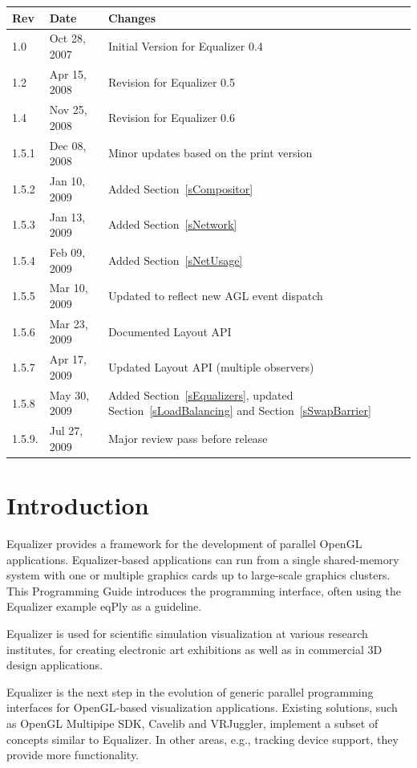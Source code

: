 \documentclass[10pt,a4]{scrartcl}
\newcommand{\sref}[1]{Section~\ref{#1}}
\begin{document}
\clearpage
{}
\pagestyle{headings}
\tableofcontents
\listoffigures \vfill{\center\begin{tabularx}{\textwidth}{|l|l|X|}
    \hline
    \bf Rev & \bf Date     & \bf Changes \\
    \hline
    1.0     & Oct 28, 2007 & Initial Version for Equalizer 0.4\\
    1.2     & Apr 15, 2008 & Revision for Equalizer 0.5\\
    1.4     & Nov 25, 2008 & Revision for Equalizer 0.6\\
    1.5.1   & Dec 08, 2008 & Minor updates based on the print version\\
    1.5.2   & Jan 10, 2009 & Added \sref{sCompositor}\\
    1.5.3   & Jan 13, 2009 & Added \sref{sNetwork}\\
    1.5.4   & Feb 09, 2009 & Added \sref{sNetUsage}\\
    1.5.5   & Mar 10, 2009 & Updated to reflect new AGL event dispatch\\
    1.5.6   & Mar 23, 2009 & Documented Layout API\\
    1.5.7   & Apr 17, 2009 & Updated Layout API (multiple observers)\\
    1.5.8   & May 30, 2009 & Added \sref{sEqualizers}, updated \sref{sLoadBalancing} and \sref{sSwapBarrier}\\
    1.5.9.  & Jul 27, 2009 & Major review pass before release\\
    \hline
  \end{tabularx}}
\clearpage

\pagestyle{headings}

\section{Introduction}

Equalizer provides a framework for the development of parallel OpenGL
applications. Equalizer-based applications can run from a single
shared-memory system with one or multiple graphics cards up to
large-scale graphics clusters. This Programming Guide introduces the
programming interface, often using the Equalizer example \textsf{eqPly}
as a guideline.

Equalizer is used for scientific simulation visualization at various
research institutes, for creating electronic art exhibitions as well as
in commercial 3D design applications.

Equalizer is the next step in the evolution of generic parallel programming
interfaces for OpenGL-based visualization applications. Existing
solutions, such as OpenGL Multipipe SDK, Cavelib and VRJuggler,
implement a subset of concepts similar to Equalizer. In other areas,
e.g., tracking device support, they provide more functionality.
\end{document}
